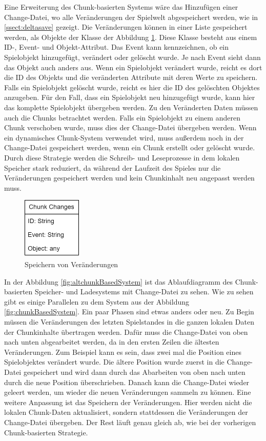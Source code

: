 Eine Erweiterung des Chunk-basierten Systems wäre das Hinzufügen einer Change-Datei, wo alle Veränderungen der Spielwelt abgespeichert werden, wie in \ref{ssect:deltasave} gezeigt. Die Veränderungen können in einer Liste gespeichert werden, als Objekte der Klasse der Abbildung \ref{fig:changesClass}. Diese Klasse besteht aus einem ID-, Event- und Objekt-Attribut. Das Event kann kennzeichnen, ob ein Spielobjekt hinzugefügt, verändert oder gelöscht wurde. Je nach Event sieht dann das Objekt auch anders aus. Wenn ein Spielobjekt verändert wurde, reicht es dort die ID des Objekts und die veränderten Attribute mit deren Werte zu speichern. Falls ein Spielobjekt gelöscht wurde, reicht es hier die ID des gelöschten Objektes anzugeben. Für den Fall, dass ein Spielobjekt neu hinzugefügt wurde, kann hier das komplette Spielobjekt übergeben werden. Zu den Veränderten Daten müssen auch die Chunks betrachtet werden. Falls ein Spielobjekt zu einem anderen Chunk verschoben wurde, muss dies der Change-Datei übergeben werden. Wenn ein dynamisches Chunk-System verwendet wird, muss außerdem noch in der Change-Datei gespeichert werden, wenn ein Chunk erstellt oder gelöscht wurde. Durch diese Strategie werden die Schreib- und Leseprozesse in dem lokalen Speicher stark reduziert, da während der Laufzeit des Spieles nur die Veränderungen gespeichert werden und kein Chunkinhalt neu angepasst werden muss.

\begin{figure}[htp]
    \centering
    \includegraphics[width=0.25\textwidth]{images/Changes.png}
    \caption{Speichern von Veränderungen}
    \label{fig:changesClass}
\end{figure}

In der Abbildung \ref{fig:altchunkBasedSystem} ist das Ablaufdiagramm des Chunk-basierten Speicher- und Ladesystems mit Change-Datei zu sehen. Wie zu sehen gibt es einige Parallelen zu dem System aus der Abbildung \ref{fig:chunkBasedSystem}. Ein paar Phasen sind etwas anders oder neu. Zu Begin müssen die Veränderungen des letzten Spielstandes in die ganzen lokalen Daten der Chunkinhalte übertragen werden. Dafür muss die Change-Datei von oben nach unten abgearbeitet werden, da in den ersten Zeilen die ältesten Veränderungen. Zum Beispiel kann es sein, dass zwei mal die Position eines Spielobjektes verändert wurde. Die ältere Position wurde zuerst in die Change-Datei gespeichert und wird dann durch das Abarbeiten von oben nach unten durch die neue Position überschrieben. Danach kann die Change-Datei wieder geleert werden, um wieder die neuen Veränderungen sammeln zu können. Eine weitere Anpassung ist das Speichern der Veränderungen. Hier werden nicht die lokalen Chunk-Daten aktualisiert, sondern stattdessen die Veränderungen der Change-Datei übergeben. Der Rest läuft genau gleich ab, wie bei der vorherigen Chunk-basierten Strategie.

